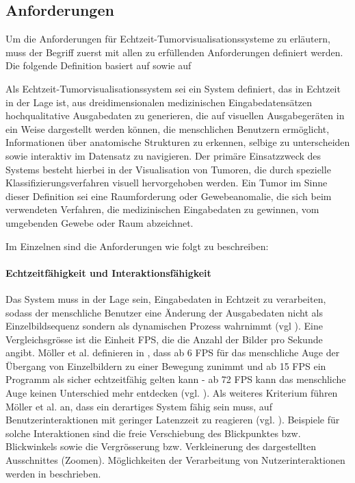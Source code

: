\documentclass[a4paper,titlepage,12pt]{scrartcl}
\newtheorem[L]{boxedDefinition}{Definition}
\begin{document}
\subsection{Anforderungen}\label{ssec:requirements}
Um die Anforderungen für Echtzeit-Tumorvisualisationssysteme zu erläutern, muss der Begriff zuerst mit allen zu erfüllenden Anforderungen definiert werden. Die folgende Definition basiert auf \cite[Kapitel 3.1.1., Seite 17]{Bruckner2004} sowie auf \cite{Kutter2008}
\begin{boxedDefinition}\label{def:rttumorvissystem}
 Als Echtzeit-Tumorvisualisationssystem sei ein System definiert, das in Echtzeit in der Lage ist, aus dreidimensionalen medizinischen Eingabedatensätzen hochqualitative Ausgabedaten zu generieren, die auf visuellen Ausgabegeräten in ein Weise dargestellt werden können, die menschlichen Benutzern ermöglicht, Informationen über anatomische Strukturen zu erkennen, selbige zu unterscheiden sowie interaktiv im Datensatz zu navigieren. Der primäre Einsatzzweck des Systems besteht hierbei in der Visualisation von Tumoren, die durch spezielle Klassifizierungsverfahren visuell hervorgehoben werden.
 Ein Tumor im Sinne dieser Definition sei eine Raumforderung oder Gewebeanomalie, die sich beim verwendeten Verfahren, die medizinischen Eingabedaten zu gewinnen, vom umgebenden Gewebe oder Raum abzeichnet.
\end{boxedDefinition}
\newpage
\noindent Im Einzelnen sind die Anforderungen wie folgt zu beschreiben:
\paragraph{Echtzeitfähigkeit und Interaktionsfähigkeit} \label{p:rtcapability} Das System muss in der Lage sein, Eingabedaten in Echtzeit zu verarbeiten, sodass der menschliche Benutzer eine Änderung der Ausgabedaten nicht als Einzelbildsequenz sondern als dynamischen Prozess wahrnimmt (vgl \cite[Kapitel 1, Seite 1]{Moeller2008}). Eine Vergleichsgrösse ist die Einheit FPS, die die Anzahl der Bilder pro Sekunde angibt. Möller et al. definieren in \cite{Moeller2008}, dass ab 6 FPS für das menschliche Auge der Übergang von Einzelbildern zu einer Bewegung zunimmt und ab 15 FPS ein Programm als sicher echtzeitfähig gelten kann - ab 72 FPS kann das menschliche Auge keinen Unterschied mehr entdecken (vgl. \cite[Kapitel 1, Seite 1]{Moeller2008}). Als weiteres Kriterium führen Möller et al. an, dass ein derartiges System fähig sein muss, auf Benutzerinteraktionen mit geringer Latenzzeit zu reagieren (vgl. \cite[Kapitel 1, Seite 1]{Moeller2008}). Beispiele für solche Interaktionen sind die freie Verschiebung des Blickpunktes bzw. Blickwinkels sowie die Vergrösserung bzw. Verkleinerung des dargestellten Ausschnittes (\glqq Zoomen\grqq). Möglichkeiten der Verarbeitung von Nutzerinteraktionen werden in \cite[Kapitel 3.6, Seite 62-66]{Bruckner2004} beschrieben.
\end{document}
